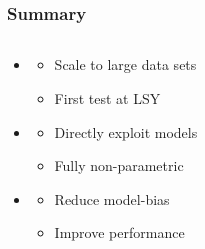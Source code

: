 \section*{}
\begin{frame}[label=summary, t]
    \frametitle{Summary}

    \centering
    \begin{columns}[t]
        \begin{column}{0.4\textwidth}
            \begin{itemize}
                \item {}
                    \begin{itemize}
                        \item Scale to large data sets
                        \item First test at LSY
                    \end{itemize}
                    \vspace{9ex}
                \item {}
                    \begin{itemize}
                        \item Directly exploit models
                        \item Fully non-parametric
                    \end{itemize}
                    \vspace{7ex}
                \item {}
                    \begin{itemize}
                        \item Reduce model-bias
                        \item Improve performance
                    \end{itemize}
            \end{itemize}
        \end{column}
        \begin{column}{0.5\textwidth}
            \centering
            \begin{figure}
                \centering
            \end{figure}
            \vspace{-3ex}
            \begin{figure}
                \centering
\end{figure}
\end{column}
\end{columns}
\end{frame}
